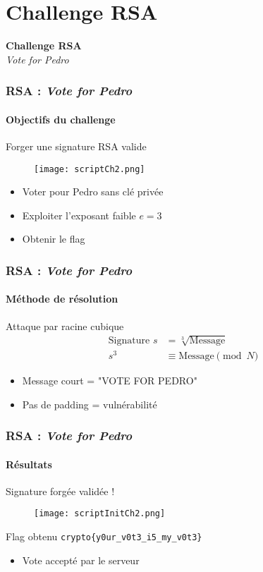 
\section{Challenge RSA}


\begin{frame}
    \centering
    \Huge{\bfseries Challenge RSA}\\[1.5em]
    \huge{\textit{Vote for Pedro}}
\end{frame}

\begin{frame}
    \frametitle{RSA : \textit{Vote for Pedro}}
    \framesubtitle{Objectifs du challenge}
\centering
{\LARGE Forger une signature RSA valide}\\
\begin{figure}
    \centering
    \texttt{[image: scriptCh2.png]}
\end{figure}
\vspace{0.1cm}
\begin{itemize}
    \item Voter pour Pedro sans clé privée
    \item Exploiter l'exposant faible $e = 3$
    \item Obtenir le flag
\end{itemize}
\end{frame}

\begin{frame}
    \frametitle{RSA : \textit{Vote for Pedro}}
    \framesubtitle{Méthode de résolution}
\centering
{\LARGE Attaque par racine cubique}
\vspace{0.5cm}
\begin{align*}
\text{Signature } s &= \sqrt[3]{\text{Message}} \\
s^3 &\equiv \text{Message} \pmod{N}
\end{align*}
\begin{itemize}
    \item Message court = "VOTE FOR PEDRO"
    \item Pas de padding = vulnérabilité
\end{itemize}
\end{frame}


\begin{frame}
        \frametitle{RSA : \textit{Vote for Pedro}}
    \framesubtitle{Résultats}
\centering
{\LARGE Signature forgée validée !}
\begin{figure}
    \centering
    \texttt{[image: scriptInitCh2.png]}
\end{figure}
\vspace{0.1cm}
\begin{block}{Flag obtenu}
\texttt{crypto\{y0ur\_v0t3\_i5\_my\_v0t3\}}
\end{block}
\begin{itemize}
    \item Vote accepté par le serveur
\end{itemize}
\end{frame}